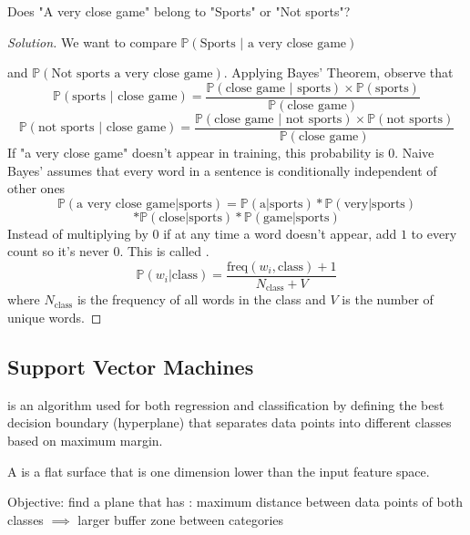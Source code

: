 \documentclass[12pt]{scrartcl}
\newcommand{\PP}{\mathbb{P}}
\begin{document}
\begin{example}
  Does "A very close game" belong to "Sports" or "Not sports"?

  \begin{proof}[Solution]
    We want to compare $\PP(\text{Sports | a very close game})$ 
    
    and $\PP(\text{Not sports a very close game})$. Applying Bayes' Theorem, observe that 
    \[\PP(\text{sports | close game}) = \frac{\PP(\text{close game | sports}) \times \PP(\text{sports})}{\PP(\text{close game})}\]
    \[\PP(\text{not sports | close game}) = \frac{\PP(\text{close game | not sports}) \times \PP(\text{not sports})}{\PP(\text{close game})}\]
    If "a very close game" doesn't appear in training, this probability is $0$. Naive Bayes'
    assumes that every word in a sentence is conditionally independent of other ones
    \[\PP(\text{a very close game} | \text{sports}) = \PP(\text{a} | \text{sports}) * \PP(\text{very} | \text{sports})\]
    \[ * \PP(\text{close} | \text{sports}) * \PP(\text{game} | \text{sports})\]
    Instead of multiplying by $0$ if at any time a word doesn't appear, add $1$ to every count so it's never $0$. 
    This is called .
    \[\PP(w_i | \text{class}) = \frac{\text{freq}(w_i, \text{class}) + 1}{N_{\text{class}} + V}\]
    where $N_{\text{class}}$ is the frequency of all words in the class and $V$ is the number 
    of unique words.
  \end{proof}
\end{example}


\subsection{Support Vector Machines}

\begin{definition}
   is an algorithm used for both regression and classification by defining 
  the best decision boundary (hyperplane) that separates data points into different classes based 
  on maximum margin.
\end{definition}

\begin{definition}
  A  is a flat surface that is one dimension lower than the input feature space.
\end{definition}

\begin{definition}
  Objective: find a plane that has : maximum distance between data points 
  of both classes $\implies$ larger buffer zone between categories
\end{definition}
\end{document}
